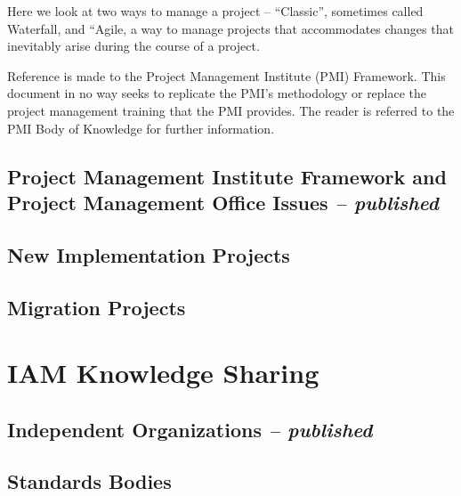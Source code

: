 Here we look at two ways to manage a project -- ``Classic'', sometimes
called Waterfall, and ``Agile, a way to manage projects that
accommodates changes that inevitably arise during the course of a
project.

Reference is made to the Project Management Institute (PMI) Framework.
This document in no way seeks to replicate the PMI's methodology or
replace the project management training that the PMI provides. The
reader is referred to the PMI Body of Knowledge for further information.

\hypertarget{project-management-institute-framework-and-project-management-office-issues-published}{%
\section{\texorpdfstring{Project Management Institute Framework and
Project Management Office Issues \emph{--
published}}{Project Management Institute Framework and Project Management Office Issues -- published}}\label{project-management-institute-framework-and-project-management-office-issues-published}}

\hypertarget{new-implementation-projects}{%
\section{New Implementation
Projects}\label{new-implementation-projects}}

\hypertarget{migration-projects}{%
\section{Migration Projects}\label{migration-projects}}

\hypertarget{iam-knowledge-sharing}{%
\chapter{IAM Knowledge Sharing}\label{iam-knowledge-sharing}}

\hypertarget{independent-organizations-published}{%
\section{\texorpdfstring{Independent Organizations \emph{--
published}}{Independent Organizations -- published}}\label{independent-organizations-published}}

\hypertarget{standards-bodies}{%
\section{Standards Bodies}\label{standards-bodies}}

